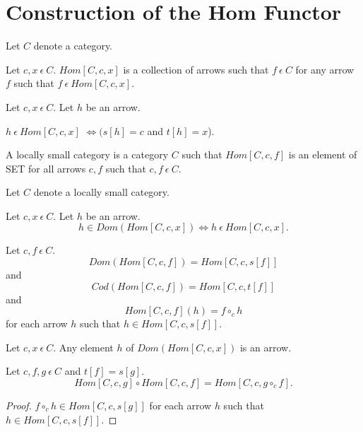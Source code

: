 \documentclass{article}
\newcommand{\mcirc}{\circ_{c}}
\newcommand{\inn}{~\epsilon~}
\newcommand{\innn}{~\epsilon~} %
\begin{document}
	\section{Construction of the Hom Functor}
	

	
	\begin{forthel}
		
		Let $C$ denote a category.	
		
		\begin{signature}
			Let $c,x \innn C$. 
			$Hom[C,c,x]$ is a collection of arrows such that $f \inn C$ for any arrow $f$ such that $f \inn Hom[C,c,x]$.
		\end{signature}
		
		\begin{axiom} 
			Let $c,x \innn C$. Let $h$ be an arrow. 
			\begin{center}
				$h \inn Hom[C,c,x]$ $\iff (s[h]=c$ and $t[h]=x$).
			\end{center}
		\end{axiom} 
				
		\begin{definition}
			A locally small category is a category $C$ such that 
			$Hom[C,c,f]$ is an element of SET for all arrows $c,f$ such that $c,f \inn C$.
		\end{definition}
		
		
		Let $C$ denote a locally small category.
		
		\begin{axiom}
			Let $c,x \innn C$. Let $h$ be an arrow. 
			$$h \in Dom(Hom[C,c,x]) \iff h \inn Hom[C,c,x].$$
		\end{axiom}

		
		\begin{axiom}
			Let $c,f \innn C$.
			$$Dom(Hom[C,c,f]) = Hom[C,c,s[f]]$$ and 
			$$Cod(Hom[C,c,f]) = Hom[C,c,t[f]]$$ and
			$$Hom[C,c,f](h) = f \mcirc h$$ for each arrow $h$ such that $h \in Hom[C,c,s[f]]$.
		\end{axiom}

		\begin{axiom} 
			Let $c,x \innn C$. Any element $h$ of $Dom(Hom[C,c,x])$ is an arrow.
		\end{axiom}
		
		\begin{lemma}[funct]
			Let $c,f,g \innn C$ and $t[f]=s[g]$.
			$$Hom[C,c,g] \circ Hom[C,c,f] = Hom[C,c,g \mcirc f].$$
		\end{lemma}
		\begin{proof}
		  $f \mcirc h \in Hom[C,c,s[g]]$ for each arrow $h$ such that $h \in Hom[C,c,s[f]]$.
		  

\end{proof}
\end{forthel}
\end{document}
